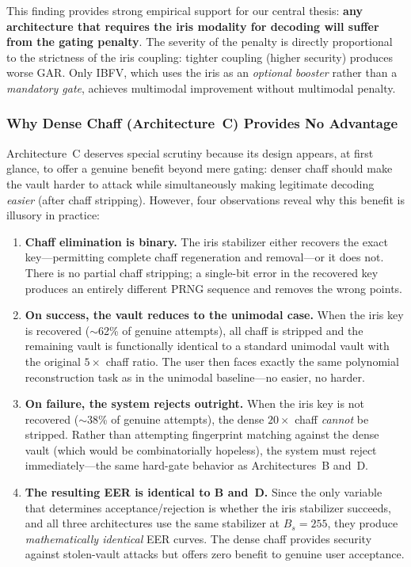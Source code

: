 \documentclass[3p,twocolumn]{elsarticle}
\newcommand{\IBFV}{\textsf{IBFV}}
\begin{document}
This finding provides strong empirical support for our central thesis: \textbf{any architecture that requires the iris modality for decoding will suffer from the gating penalty}. The severity of the penalty is directly proportional to the strictness of the iris coupling: tighter coupling (higher security) produces worse GAR. Only \IBFV{}, which uses the iris as an \emph{optional booster} rather than a \emph{mandatory gate}, achieves multimodal improvement without multimodal penalty.

\subsubsection{Why Dense Chaff (Architecture~C) Provides No Advantage}
\label{sec:chaff_analysis}

Architecture~C deserves special scrutiny because its design appears, at first glance, to offer a genuine benefit beyond mere gating: denser chaff should make the vault harder to attack while simultaneously making legitimate decoding \emph{easier} (after chaff stripping). However, four observations reveal why this benefit is illusory in practice:

\begin{enumerate}
    \item \textbf{Chaff elimination is binary.} The iris stabilizer either recovers the exact key---permitting complete chaff regeneration and removal---or it does not. There is no partial chaff stripping; a single-bit error in the recovered key produces an entirely different PRNG sequence and removes the wrong points.
    \item \textbf{On success, the vault reduces to the unimodal case.} When the iris key is recovered ($\sim$62\% of genuine attempts), all chaff is stripped and the remaining vault is functionally identical to a standard unimodal vault with the original $5\times$ chaff ratio. The user then faces exactly the same polynomial reconstruction task as in the unimodal baseline---no easier, no harder.
    \item \textbf{On failure, the system rejects outright.} When the iris key is not recovered ($\sim$38\% of genuine attempts), the dense $20\times$ chaff \emph{cannot} be stripped. Rather than attempting fingerprint matching against the dense vault (which would be combinatorially hopeless), the system must reject immediately---the same hard-gate behavior as Architectures~B and~D.
    \item \textbf{The resulting EER is identical to B and~D.} Since the only variable that determines acceptance/rejection is whether the iris stabilizer succeeds, and all three architectures use the same stabilizer at $B_s = 255$, they produce \emph{mathematically identical} EER curves. The dense chaff provides security against stolen-vault attacks but offers zero benefit to genuine user acceptance.
\end{enumerate}
\end{document}
